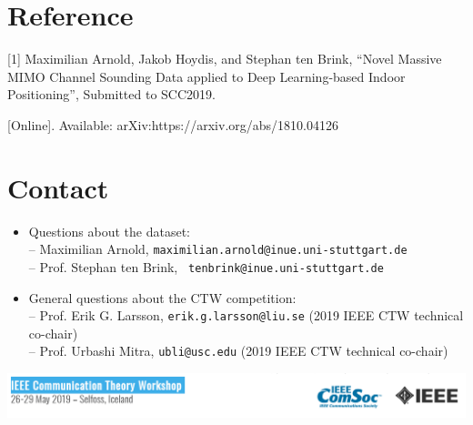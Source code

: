 \documentclass[letter]{moderncv} %
\begin{document}





\section{Reference}%
[1] Maximilian Arnold, Jakob Hoydis, and Stephan ten Brink,  ``Novel Massive MIMO Channel Sounding Data applied to Deep Learning-based Indoor Positioning'', Submitted to SCC2019.

[Online]. Available: arXiv:https://arxiv.org/abs/1810.04126

\section{Contact}

\begin{itemize}
\item Questions about the dataset: \\
-- Maximilian Arnold, \texttt{maximilian.arnold@inue.uni-stuttgart.de} \\
-- Prof. Stephan ten Brink, \texttt{
	tenbrink@inue.uni-stuttgart.de} \\

\item General questions about the CTW competition: \\
-- Prof. Erik G. Larsson, \texttt{erik.g.larsson@liu.se} (2019 IEEE CTW technical co-chair) \\
-- Prof. Urbashi Mitra, \texttt{ubli@usc.edu} (2019 IEEE CTW technical co-chair) 

\end{itemize}

\vspace{65ex}

\includegraphics[width=1\textwidth]{Comsoc}
\end{document}
